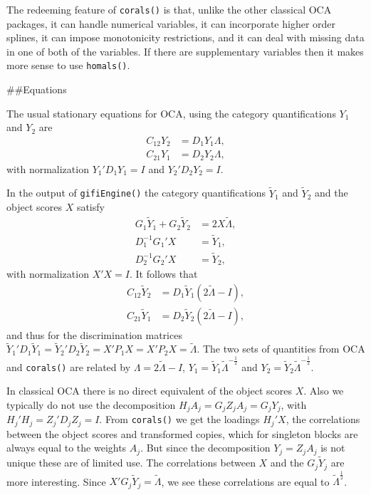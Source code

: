 \documentclass[
  12pt,
]{book}
\begin{document}
The redeeming feature of \texttt{corals()} is that, unlike the other classical OCA packages, it can handle numerical variables, it can incorporate higher order splines, it can impose monotonicity restrictions, and it can deal with missing data in one of both of the variables. If there are supplementary variables then it makes more sense to use \texttt{homals()}.

\#\#Equations

The usual stationary equations for OCA, using the category quantifications \(Y_1\) and \(Y_2\) are
\begin{align*}
C_{12}Y_2&=D_1Y_1\Lambda,\\
C_{21}Y_1&=D_2Y_2\Lambda,
\end{align*}
with normalization \(Y_1'D_1Y_1=I\) and \(Y_2'D_2Y_2=I\).

In the output of \texttt{gifiEngine()} the category quantifications \(\tilde Y_1\) and \(\tilde Y_2\) and the object scores \(X\) satisfy
\begin{align*}
G_1\tilde Y_1+G_2\tilde Y_2&=2X\tilde\Lambda,\\
D_1^{-1}G_1'X&=\tilde Y_1,\\
D_2^{-1}G_2'X&=\tilde Y_2,
\end{align*}
with normalization \(X'X=I\). It follows that
\begin{align*}
C_{12}\tilde Y_2&=D_1\tilde Y_1(2\tilde\Lambda-I),\\
C_{21}\tilde Y_1&=D_2\tilde Y_2(2\tilde\Lambda-I),
\end{align*}
and thus for the discrimination matrices \(\tilde Y_1'D_1\tilde Y_1=\tilde Y_2'D_2\tilde Y_2=X'P_1X=X'P_2X=\tilde\Lambda\). The two sets of quantities from OCA and \texttt{corals()} are related by \(\Lambda=2\tilde\Lambda-I\), \(Y_1=\tilde Y_1\tilde\Lambda^{-\frac12}\) and \(Y_2=\tilde Y_2\tilde\Lambda^{-\frac12}\).

In classical OCA there is no direct equivalent of the object scores \(X\). Also we typically do not use the decomposition \(H_jA_j=G_jZ_jA_j=G_jY_j\), with \(H_j'H_j=Z_j'D_jZ_j=I\). From \texttt{corals()} we get the loadings \(H_j'X\), the correlations between the object scores and transformed copies, which for singleton blocks are always equal to the weights \(A_j\). But since the decomposition \(Y_j=Z_jA_j\) is not unique these are of limited use. The correlations
between \(X\) and the \(G_j\tilde Y_j\) are more interesting. Since \(X'G_j\tilde Y_j=\tilde\Lambda\), we see these correlations are equal to \(\tilde\Lambda^\frac12\).
\end{document}
